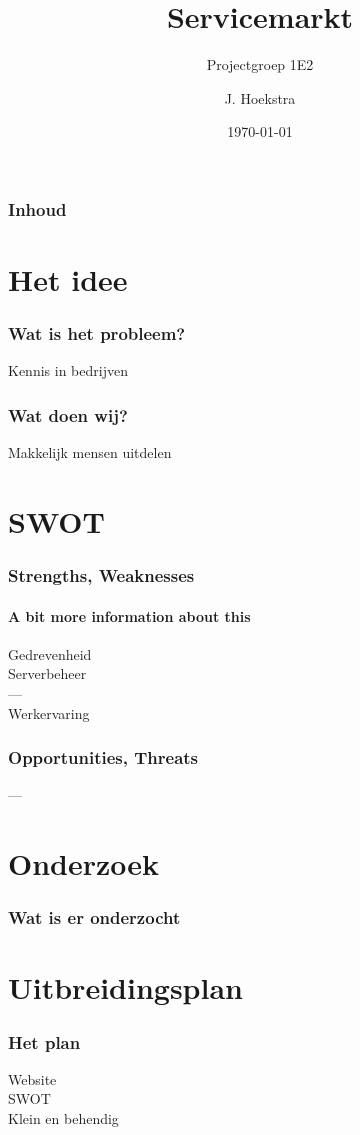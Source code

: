 \documentclass[luatex,aspectratio=169,mathserif,serif]{beamer}
\title{Servicemarkt}
\subtitle{Projectgroep 1E2}
\author{J. Hoekstra}
\institute{NHL Stenden Hogeschool}
\date{\today}
\begin{document}
  \frame{\titlepage}
  \begin{frame}
	  \frametitle{Inhoud}
	  \tableofcontents
  \end{frame}
  \section{Het idee}
	\begin{frame}
		\frametitle{Wat is het probleem?}
		Kennis in bedrijven \\
		
	\end{frame}

	\begin{frame}
		\frametitle{Wat doen wij?}
		Makkelijk mensen uitdelen \\

	\end{frame}
  \section{SWOT}
  	\begin{frame}
    		\frametitle{Strengths, Weaknesses}
    		\framesubtitle{A bit more information about this}
		Gedrevenheid \\
		Serverbeheer \\
		--- \\
		Werkervaring \\
  	\end{frame}
  	\begin{frame}
		\frametitle{Opportunities, Threats}
		
		---

	\end{frame}
  \section{Onderzoek}
  	\begin{frame}
		\frametitle{Wat is er onderzocht}
  	\end{frame}

  \section{Uitbreidingsplan}
	\begin{frame}
		\frametitle{Het plan}
		
		Website \\
		SWOT \\
		Klein en behendig
	\end{frame}
\end{document}
